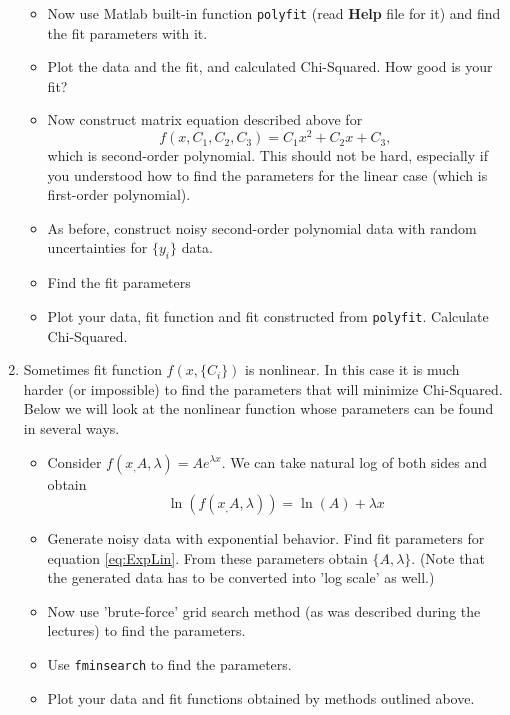 \documentclass[letterpaper]{article}
\begin{document}
\begin{enumerate}
\begin{itemize}
\item Now use Matlab built-in function \verb|polyfit| (read \textbf{Help} file for it) and find the fit parameters with it.
\item Plot the data and the fit, and calculated Chi-Squared. How good is your fit?
\item Now construct matrix equation described above for
\begin{equation*}
f(x,C_1,C_2,C_3)=C_1 x^2+C_2 x+C_3,
\end{equation*}
which is second-order polynomial. This should not be hard, especially if you understood how to find the parameters for the linear case (which is first-order polynomial).
\item As before, construct noisy second-order polynomial data with random uncertainties for $\{y_i\}$ data.
\item Find the fit parameters
\item Plot your data, fit function and fit constructed from \verb|polyfit|. Calculate Chi-Squared.
\end{itemize}
\item Sometimes fit function $f(x,\{C_i\})$ is nonlinear. In this case it is much harder (or impossible) to find the parameters that will minimize Chi-Squared. Below we will look at the nonlinear function whose parameters can be found in several ways.
\begin{itemize}
\item Consider $f(x_,A,\lambda)=A e^{\lambda x}$. We can take natural log of both sides and obtain 
\begin{equation}
\label{eq:ExpLin}
\ln(f(x_,A,\lambda))=\ln(A)+\lambda x
\end{equation}
\item Generate noisy data with exponential behavior. Find fit parameters for equation \ref{eq:ExpLin}. From these parameters obtain $\{A,\lambda\}$. (Note that the generated data has to be converted into 'log scale' as well.)
\item Now use 'brute-force' grid search method (as was described during the lectures) to find the parameters.
\item Use \verb|fminsearch| to find the parameters.
\item Plot your data and fit functions obtained by methods outlined above. 
\end{itemize}
\end{enumerate}
\end{document}
